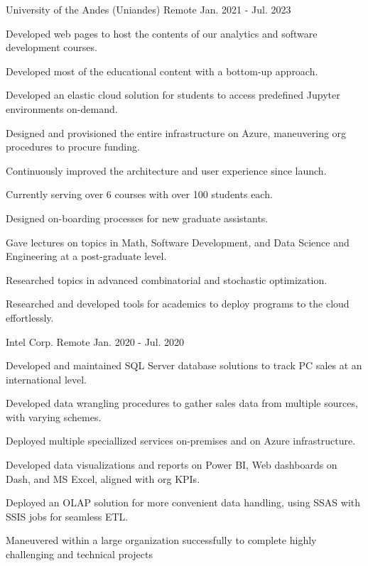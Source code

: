 \begin{cventries}
	{University of the Andes (Uniandes)} %
	{Remote} %
	{Jan. 2021 {-} Jul. 2023} %
	{
		\begin{cvitems} %
			\item {Developed web pages to host the contents of our analytics and software development courses.}
			\item {Developed most of the educational content with a bottom-up approach.}
			\item {Developed an elastic cloud solution for students to access predefined Jupyter environments on-demand.}
			\item {Designed and provisioned the entire infrastructure on Azure, maneuvering org procedures to procure funding.}
			\item {Continuously improved the architecture and user experience since launch.}
			\item {Currently serving over 6 courses with over 100 students each.}
			\item {Designed on-boarding processes for new graduate assistants.}
			\item {Gave lectures on topics in Math, Software Development, and Data Science and Engineering at a post-graduate level.}
			\item {Researched topics in advanced combinatorial and stochastic optimization.}
			\item {Researched and developed tools for academics to deploy programs to the cloud effortlessly.}
		\end{cvitems}
	}

	{Intel Corp.} %
	{Remote} %
	{Jan. 2020 {-} Jul. 2020} %
	{
		\begin{cvitems}
			\item {Developed and maintained SQL Server database solutions to track PC sales at an international level.}
			\item {Developed data wrangling procedures to gather sales data from multiple sources, with varying schemes.}
			\item {Deployed multiple speciallized services on-premises and on Azure infrastructure.}
			\item {Developed data visualizations and reports on Power BI, Web dashboards on Dash, and MS Excel, aligned with org KPIs.}
			\item {Deployed an OLAP solution for more convenient data handling, using SSAS with SSIS jobs for seamless ETL.}
			\item {Maneuvered within a large organization successfully to complete highly challenging and technical projects}
		\end{cvitems}
	}


\end{cventries}
